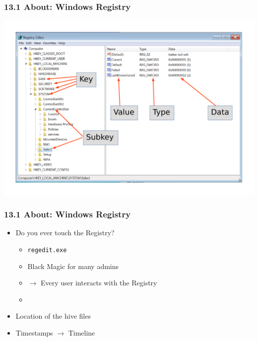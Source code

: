 \begin{frame}[fragile]
  \frametitle{13.1 About: Windows Registry}
    \includegraphics[scale=0.5]{images/nomenclature.pdf}
\end{frame}


\begin{frame}[fragile]
  \frametitle{13.1 About: Windows Registry}
    \begin{itemize}
        \item Do you ever touch the Registry?
            \begin{itemize}
		\item \texttt{regedit.exe}
                \item Black Magic for many admins
		\item[] $\to$ Every user interacts with the Registry
		\item[]
            \end{itemize}
        \item Location of the hive files
        \item Timestamps $\to$ Timeline
    \end{itemize}
\end{frame}


